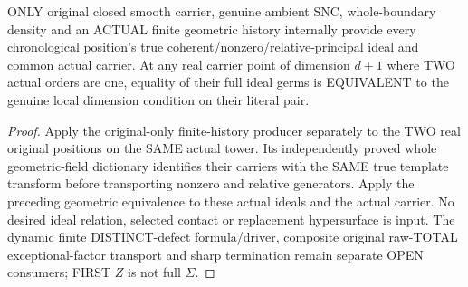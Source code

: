 \begin{theorem}
\label{hir:sharp-original-chronological-actual-shared-branch-dimension}
\leanok
ONLY original closed smooth carrier, genuine ambient SNC, whole-boundary
density and an ACTUAL finite geometric history internally provide every
chronological position's true coherent/nonzero/relative-principal ideal
and common actual carrier. At any real carrier point of dimension $d+1$
where TWO actual orders are one, equality of their full ideal germs is
EQUIVALENT to the genuine local dimension condition on their literal pair.
\end{theorem}
\begin{proof}
Apply the original-only finite-history producer separately to the TWO real
original positions on the SAME actual tower. Its independently proved
whole geometric-field dictionary identifies their carriers with the SAME
true template transform before transporting nonzero and relative generators.
Apply the preceding geometric equivalence to these actual ideals and the
actual carrier. No desired ideal relation, selected contact or replacement
hypersurface is input. The dynamic finite DISTINCT-defect formula/driver,
composite original raw-TOTAL exceptional-factor transport and sharp
termination remain separate OPEN consumers; FIRST $Z$ is not full $\Sigma$.
\end{proof}
